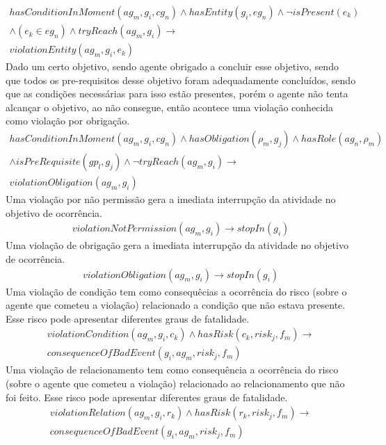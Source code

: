 \documentclass[12pt]{article}
\begin{document}
\begin{eqnarray}\nonumber
	hasConditionInMoment(ag_m,g_i,cg_n) \wedge hasEntity(g_i,eg_n) \wedge \neg isPresent(e_k) \nonumber \\ 
	\wedge (e_k \in eg_n) \wedge tryReach(ag_m,g_i) \to \nonumber \\ 
	violationEntity(ag_m,g_i,e_k) 
\end{eqnarray}
Dado um certo objetivo, sendo agente obrigado a concluir esse objetivo, sendo que todos os pre-requisitos desse objetivo foram adequadamente concluídos, sendo que as condições necessárias para isso estão presentes, porém o agente não tenta alcançar o objetivo, 
ao não consegue, então acontece uma violação conhecida como violação por obrigação.
\begin{eqnarray}\nonumber
	hasConditionInMoment(ag_m,g_i,cg_n) \wedge hasObligation(\rho_m,g_j) \wedge hasRole(ag_n,\rho_m) \nonumber \\ 
	\wedge isPreRequisite(gp_l,g_j) \wedge \neg tryReach(ag_m,g_i) \to \nonumber \\ 
	violationObligation(ag_m,g_i)
\end{eqnarray}
Uma violação por não permissão gera a imediata interrupção da atividade no objetivo de ocorrência.
\begin{eqnarray}
	violationNotPermission(ag_m,g_i) \to stopIn(g_i)
\end{eqnarray}
Uma violação de obrigação gera a imediata interrupção da atividade no objetivo de ocorrência.
\begin{eqnarray}
	violationObligation(ag_m,g_i) \to stopIn(g_i)
\end{eqnarray}
Uma violação de condição tem como consequêcias a ocorrência do risco (sobre o agente que cometeu a violação) relacionado a condição que não estava presente. Esse risco pode apresentar diferentes graus de fatalidade.
\begin{eqnarray}\nonumber
	violationCondition(ag_m,g_i,c_k)  \wedge hasRisk(c_k,risk_j,f_m) \to \\ 
	consequenceOfBadEvent(g_i,ag_m,risk_j,f_m)
\end{eqnarray}
Uma violação de relacionamento tem como consequência a ocorrência do risco (sobre o agente que cometeu a violação) relacionado ao relacionamento que não foi feito. Esse risco pode apresentar diferentes graus de fatalidade.
\begin{eqnarray}\nonumber
	violationRelation(ag_m,g_i,r_k) \wedge hasRisk(r_k,risk_j,f_m) \to \\ 
	consequenceOfBadEvent(g_i,ag_m,risk_j,f_m)
\end{eqnarray}
\end{document}
